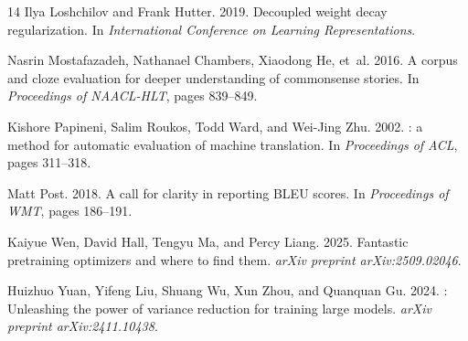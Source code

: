 \documentclass[11pt]{article}
\begin{document}
\begin{thebibliography}{14}
Ilya Loshchilov and Frank Hutter. 2019.
\newblock Decoupled weight decay regularization.
\newblock In \emph{International Conference on Learning Representations}.

Nasrin Mostafazadeh, Nathanael Chambers, Xiaodong He, et~al. 2016.
\newblock A corpus and cloze evaluation for deeper understanding of commonsense
  stories.
\newblock In \emph{Proceedings of NAACL-HLT}, pages 839--849.

Kishore Papineni, Salim Roukos, Todd Ward, and Wei-Jing Zhu. 2002.
: a method for automatic evaluation of machine translation.
\newblock In \emph{Proceedings of ACL}, pages 311--318.

Matt Post. 2018.
\newblock A call for clarity in reporting {BLEU} scores.
\newblock In \emph{Proceedings of WMT}, pages 186--191.

Kaiyue Wen, David Hall, Tengyu Ma, and Percy Liang. 2025.
\newblock Fantastic pretraining optimizers and where to find them.
\newblock \emph{arXiv preprint arXiv:2509.02046}.

Huizhuo Yuan, Yifeng Liu, Shuang Wu, Xun Zhou, and Quanquan Gu. 2024.
: Unleashing the power of variance reduction for training large
  models.
\newblock \emph{arXiv preprint arXiv:2411.10438}.

\end{thebibliography}
\end{document}
